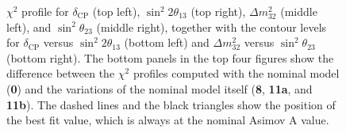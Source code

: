 \begin{figure}
	\centering
	\resizebox{0.49\linewidth}{!}{}
	\resizebox{0.49\linewidth}{!}{}
	\resizebox{0.49\linewidth}{!}{}
	\resizebox{0.49\linewidth}{!}{}
	\resizebox{0.49\linewidth}{!}{}	%
	\resizebox{0.49\linewidth}{!}{}	%
	\caption[$\chi^2$ profiles for $\delta_\text{CP}$, $\Delta m_{32}^2$, $\sin^2 2\theta_{13}$, and $\sin\theta_{23}$ %
		and contours for $\Delta m_{32}^2$ versus $\sin\theta_{23}$ and $\delta_\text{CP}$ versus $\sin^2 2\theta_{13}$ %
		with variations on the nominal systematic model]%
		{$\chi^2$ profile for $\delta_\text{CP}$ (top left), $\sin^2 2\theta_{13}$ (top right), %
		$\Delta m_{32}^2$ (middle left), and $\sin^2 \theta_{23}$ (middle right), %
		together with the contour levels for $\delta_\text{CP}$ versus $\sin^2 2\theta_{13}$ (bottom left) %
		and $\Delta m_{32}^2$ versus $\sin^2 \theta_{23}$ (bottom right).
		The bottom panels in the top four figures show the difference between the $\chi^2$ profiles computed %
		with the nominal model (\textbf{0}) and the variations of the nominal model itself %
		(\textbf{8}, \textbf{11a}, and \textbf{11b}).
		The dashed lines and the black triangles show the position of the best fit value, %
		which is always at the nominal Asimov A value.}
	\label{fig:0_11a_11b_8_profile}
\end{figure}

